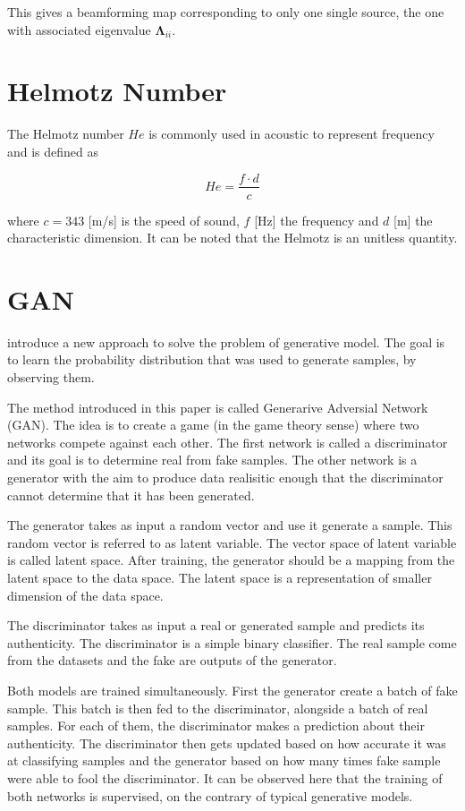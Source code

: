 \documentclass[11pt,a4paper,twoside]{report}
\begin{document}
This gives a beamforming map corresponding to only one single source, the one with associated eigenvalue $\mathbf{\Lambda}_{ii}$.

\section{Helmotz Number}

The Helmotz number $He$ is commonly used in acoustic to represent frequency and is defined as

\begin{equation}
    He = \frac{f \cdot d}{c}  
\end{equation}

where $c = 343$ [m/s] is the speed of sound, $f$ [Hz] the frequency and $d$ [m] the characteristic dimension. It can be noted that the Helmotz is an unitless quantity. 

\section{GAN}

\cite{goodfellow2020generative} introduce a new approach to solve the problem of generative model. The goal is to learn the probability distribution that was used to generate samples, by observing them.

The method introduced in this paper is called Generarive Adversial Network (GAN). The idea is to create a game (in the game theory sense) where two networks compete against each other. The first network is called a discriminator and its goal is to determine real from fake samples. The other network is a  generator with the aim to produce data realisitic enough that the discriminator cannot determine that it has been generated.

The generator takes as input a random vector and use it generate a sample. This random vector is referred to as latent variable. The vector space of latent variable is called latent space. After training, the generator should be a mapping from the latent space to the data space. The latent space is  a representation of smaller dimension of the data space.

The discriminator takes as input a real or generated sample and predicts its authenticity. The discriminator is a simple binary classifier. The real sample come from the datasets and the fake are outputs of the generator.

Both models are trained simultaneously. First the generator create a batch of fake sample. This batch is then fed to the discriminator, alongside a batch of real samples. For each of them, the discriminator makes a prediction about their authenticity. The discriminator then gets updated based on how accurate it was at classifying samples and the generator based on how many times fake sample were able to fool the discriminator. It can be observed here that the training of both networks is supervised, on the contrary of typical generative models.
\end{document}
